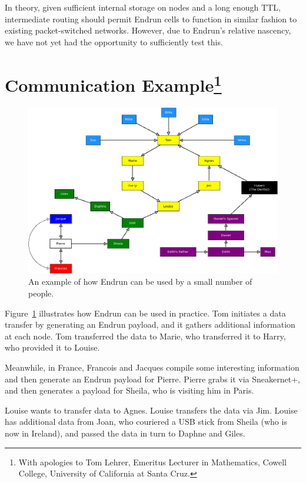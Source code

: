 \documentclass[12pt]{article}
\begin{document}
  In theory, given sufficient internal storage on nodes and a long enough TTL, intermediate routing should permit Endrun cells to function in similar fashion to existing packet-switched networks. However, due to Endrun's relative nascency, we have not yet had the opportunity to sufficiently test this.
    
  \section{Communication Example\footnote{With apologies to Tom Lehrer, Emeritus Lecturer in Mathematics, Cowell College, University of California at Santa Cruz.}}
  
      \begin{figure}[h]
      \centering{}
      \includegraphics[scale=0.45]{Diagram3.png}
      \caption{ An example of how Endrun can be used by a small number of people.}
      \label{fig:igotitfromagnes}
    \end{figure}
  
  Figure~\ref{fig:igotitfromagnes} illustrates how Endrun can be used in practice. Tom initiates a data transfer by generating an Endrun payload, and it gathers additional information at each node. Tom transferred the data to Marie, who transferred it to Harry, who provided it to Louise.
  
  Meanwhile, in France, Francois and Jacques compile some interesting information and then generate an Endrun payload for Pierre. Pierre grabs it via Sneakernet+, and then generates a payload for Sheila, who is visiting him in Paris.
  
  Louise wants to transfer data to Agnes. Louise transfers the data via Jim. Louise has additional data from Joan, who couriered a USB stick from Sheila (who is now in Ireland), and passed the data in turn to Daphne and Giles.
  
\end{document}
